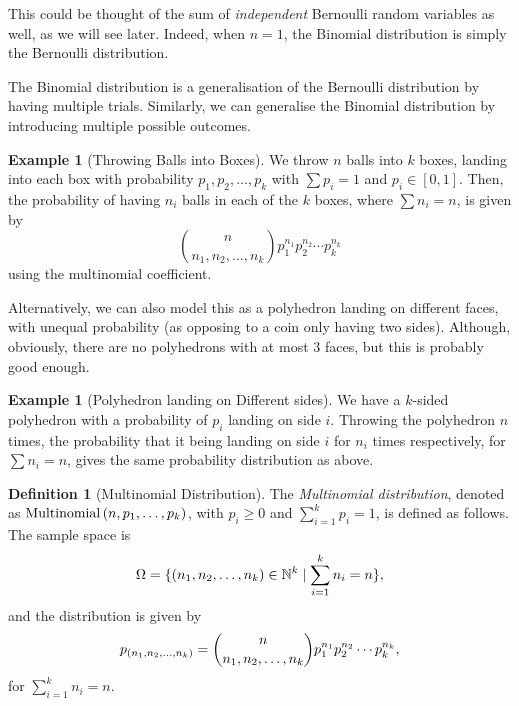 \documentclass{article}
\theoremstyle{definition}
\newtheorem{definition}[theorem]{Definition}
\newtheorem{example}[theorem]{Example}
\theoremstyle{remark}
\newcommand{\NN}{\mathbb{N}}
\newcommand{\ccintv}[2]{[#1,#2]}
\newcommand{\set}[2]{\{#1\mid #2\}}
\newcommand{\Multinomial}{\operatorname{Multinomial}}
\begin{document}
This could be thought of the sum of \emph{independent} Bernoulli random variables as well, as we will see later. Indeed, when \(n = 1\), the Binomial distribution is simply the Bernoulli distribution.

The Binomial distribution is a generalisation of the Bernoulli distribution by having multiple trials. Similarly, we can generalise the Binomial distribution by introducing multiple possible outcomes.

\begin{example}[Throwing Balls into Boxes]
    \label{ex:throwing-balls-into-boxes}%
    We throw \(n\) balls into \(k\) boxes, landing into each box with probability \(p_1, p_2, \ldots, p_k\) with \(\sum p_i = 1\) and \(p_i \in \ccintv{0}{1}\). Then, the probability of having \(n_i\) balls in each of the \(k\) boxes, where \(\sum n_i = n\), is given by
    \[
        \binom{n}{n_1, n_2, \ldots, n_k} p_1^{n_1} p_2^{n_2} \cdots p_k^{n_k}
    \]
    using the multinomial coefficient.
\end{example}

Alternatively, we can also model this as a polyhedron landing on different faces, with unequal probability (as opposing to a coin only having two sides). Although, obviously, there are no polyhedrons with at most 3 faces, but this is probably good enough.

\begin{example}[Polyhedron landing on Different sides]
    \label{ex:polyhedron-different-sides}%
    We have a \(k\)-sided polyhedron with a probability of \(p_i\) landing on side \(i\). Throwing the polyhedron \(n\) times, the probability that it being landing on side \(i\) for \(n_i\) times respectively, for \(\sum n_i = n\), gives the same probability distribution as above.
\end{example}

\begin{definition}[Multinomial Distribution]
    \label{def:multinomial-distribution}%
    The \emph{Multinomial distribution}, denoted as \(\Multinomial\pqty{n, p_1, \ldots, p_k}\), with \(p_i \geq 0\) and \(\sum_{i = 1}^{k} p_i = 1\), is defined as follows. The sample space is
    \[
        \Omega = \set{\pqty{n_1, n_2, \ldots, n_k} \in \NN^k}{\sum_{i = 1}^{k} n_i = n},
    \]
    and the distribution is given by
    \[
        p_{\left(n_1, n_2, \ldots, n_k\right)} = \binom{n}{n_1, n_2, \ldots, n_k} p_1^{n_1} p_2^{n_2} \cdots p_k^{n_k},
    \]
    for \(\sum_{i = 1}^{k} n_i = n\).
\end{definition}
\end{document}
